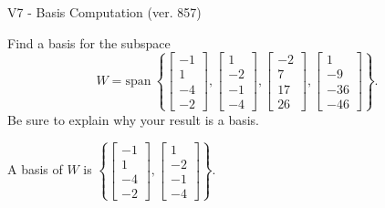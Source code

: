 \begin{exercise}
  \begin{exerciseTitle}V7 - Basis Computation (ver. 857)\end{exerciseTitle}
  \begin{exerciseStatement}
    Find a basis for the subspace 
\[W=\mathrm{span}\ \left\{\left[\begin{array}{r}
-1 \\
1 \\
-4 \\
-2
\end{array}\right] , \left[\begin{array}{r}
1 \\
-2 \\
-1 \\
-4
\end{array}\right] , \left[\begin{array}{r}
-2 \\
7 \\
17 \\
26
\end{array}\right] , \left[\begin{array}{r}
1 \\
-9 \\
-36 \\
-46
\end{array}\right]\right\}.\]
 Be sure to explain why your result is a basis.


  \end{exerciseStatement}
  \begin{exerciseAnswer}
   A basis of \(W\) is  \(\left\{\left[\begin{array}{r}
-1 \\
1 \\
-4 \\
-2
\end{array}\right] , \left[\begin{array}{r}
1 \\
-2 \\
-1 \\
-4
\end{array}\right]\right\}\).
  


  \end{exerciseAnswer}
\end{exercise}